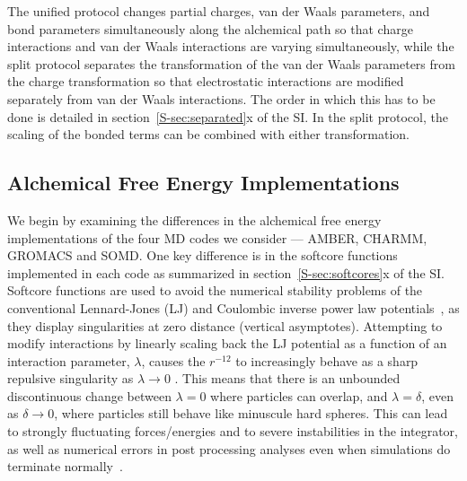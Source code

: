 \documentclass[journal=jctcce,manuscript=article]{achemso}
\begin{document}
The unified protocol changes partial charges, van der Waals parameters, and bond parameters simultaneously along the alchemical path so that charge interactions and van der Waals interactions are varying simultaneously, while the split protocol separates the transformation of the van der Waals parameters from the charge transformation so that electrostatic interactions are modified separately from van der Waals interactions.
The order in which this has to be done is detailed in 
section~\ref{S-sec:separated}x of the SI.  In the split protocol, the scaling of the bonded terms can be combined with either transformation.


\subsection{Alchemical Free Energy Implementations}
\label{sec:afe_impl}

We begin by examining the differences in the alchemical free energy
implementations of the four MD codes we consider --- AMBER, CHARMM, GROMACS and
SOMD.  One key difference is in the softcore
functions~\cite{beutler_avoiding_1994, zacharias_separationshifted_1994} 
implemented in each code as summarized in section~\ref{S-sec:softcores}x of the 
SI.  Softcore functions are used to avoid the numerical 
stability problems of the conventional Lennard-Jones (LJ) and Coulombic inverse power law 
potentials~\cite{ISI:A1993MB07100015,steinbrecher_nonlinear_2007}, as they display singularities at 
zero distance (vertical asymptotes).  Attempting to modify interactions by 
linearly scaling back the LJ potential as a function of an 
interaction parameter, $\lambda$, causes the $r^{-12}$ to increasingly behave 
as a sharp repulsive singularity as $\lambda\rightarrow 0$ \cite{ISI:A1993MB07100015}.  This means that there 
is an unbounded discontinuous change between $\lambda = 0$ where particles can overlap, 
and $\lambda = \delta$, even as $\delta \rightarrow 0$, where particles still 
behave like minuscule hard spheres. This can lead to strongly 
fluctuating forces/energies and to severe instabilities in the integrator, as 
well as numerical errors in post processing analyses even when simulations do 
terminate normally~\cite{beutler_avoiding_1994, 
zacharias_separationshifted_1994, steinbrecher_nonlinear_2007}.
\end{document}
